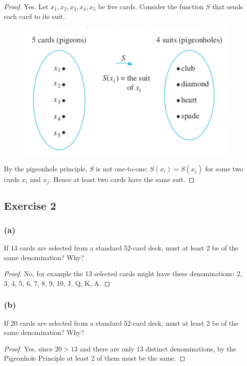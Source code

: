 \documentclass[14pt]{extarticle}
\begin{document}
\begin{proof}
Yes. Let \(x_1,x_2,x_3,x_4,x_5\) be five cards. Consider the function \(S\) that sends each card to its suit.

\begin{figure}[ht!]
\centering
\includegraphics[scale=0.5]{../images/9.4.1.b.png}
\end{figure}

By the pigeonhole principle, \(S\) is not one-to-one: \(S(x_i) = S(x_j)\) for some two cards \(x_i\) and \(x_j\). 
Hence at least two cards have the same suit.
\end{proof}

\subsection{Exercise 2}
\subsubsection{(a)}
If 13 cards are selected from a standard 52-card deck, must at least 2 be of the same denomination? Why?

\begin{proof}
No, for example the 13 selected cards might have these denominations: 2, 3, 4, 5, 6, 7, 8, 9, 10, J, Q, K, A.
\end{proof}

\subsubsection{(b)}
If 20 cards are selected from a standard 52-card deck, must at least 2 be of the same denomination? Why?

\begin{proof}
Yes, since \(20 > 13\) and there are only 13 distinct denominations, by the Pigeonhole Principle at least 2 of 
them must be the same.
\end{proof}
\end{document}
